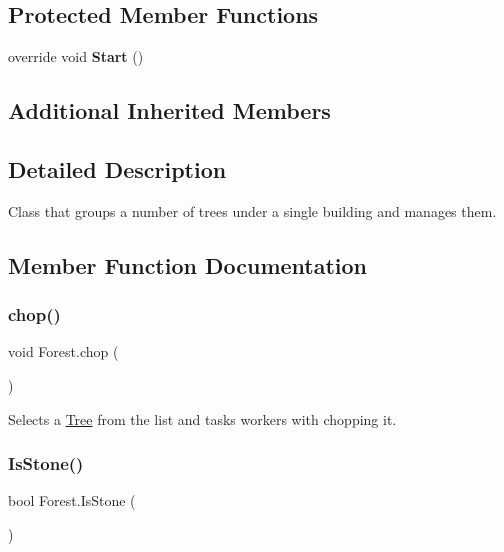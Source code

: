\subsection*{Protected Member Functions}
\begin{DoxyCompactItemize}
\item 
\mbox{\label{class_forest_abc4aecd915917388d66bb97f8429d18a}} 
override void {\bfseries Start} ()
\end{DoxyCompactItemize}
\subsection*{Additional Inherited Members}


\subsection{Detailed Description}
Class that groups a number of trees under a single building and manages them. 



\subsection{Member Function Documentation}
\mbox{\label{class_forest_a353da5f43e948f6c3c4c5a8dd255bcce}} 
\subsubsection{\texorpdfstring{chop()}{chop()}}
{\footnotesize\ttfamily void Forest.\+chop (\begin{DoxyParamCaption}{ }\end{DoxyParamCaption})}



Selects a \mbox{\hyperlink{class_tree}{Tree}} from the list and tasks workers with chopping it. 

\mbox{\label{class_forest_a7e93acae12bdeeac94b41a214ca0b1ce}} 
\subsubsection{\texorpdfstring{Is\+Stone()}{IsStone()}}
{\footnotesize\ttfamily bool Forest.\+Is\+Stone (\begin{DoxyParamCaption}{ }\end{DoxyParamCaption})}



